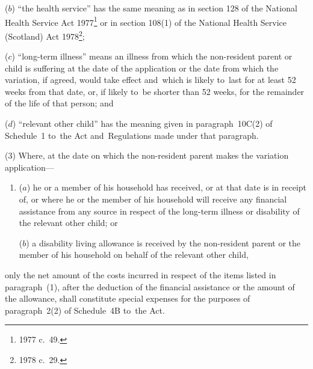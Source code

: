 \documentclass[12pt,a4paper]{article}
\begin{document}
\begin{enumerate}
($b$) “the health service” has the same meaning as in section 128 of the National Health Service Act 1977\footnote{1977 c.\ 49.} or in section 108(1) of the National Health Service (Scotland) Act 1978\footnote{1978 c.\ 29.};

($c$) “long-term illness” means an illness from which the non-resident parent or child is suffering at the date of the application or the date from which the variation, if agreed, would take effect and~which is likely to~last for at least 52 weeks from that date, or, if likely to~be shorter than 52 weeks, for the remainder of the life of that person; and

($d$) “relevant other child” has the meaning given in paragraph~10C(2) of Schedule~1 to~the Act and~Regulations made under that paragraph.
\end{enumerate}


(3) Where, at the date on which the non-resident parent makes the variation application—
\begin{enumerate}\item[]
($a$) he or a member of his household has received, or at that date is in receipt of, or where he or the member of his household will receive any financial assistance from any source in respect of the long-term illness or disability of the relevant other child; or

($b$) a disability living allowance is received by the non-resident parent or the member of his household on behalf of the relevant other child,
\end{enumerate}
only the net amount of the costs incurred in respect of the items listed in paragraph~(1), after the deduction of the financial assistance or the amount of the allowance, shall constitute special expenses for the purposes of paragraph~2(2) of Schedule~4B to~the Act.
\end{document}
